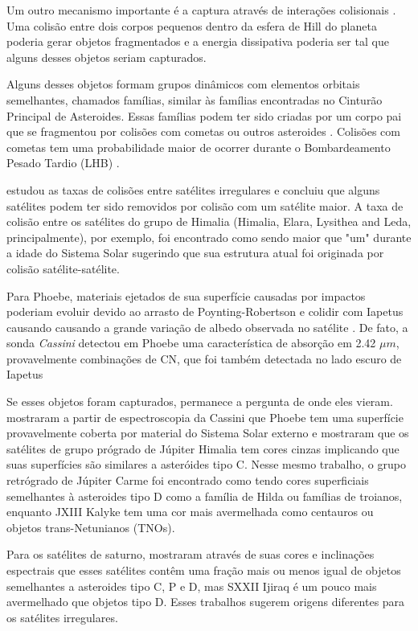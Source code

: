 \documentclass[12pt,a4paper]{monografia}
\begin{document}
Um outro mecanismo importante é a captura através de interações colisionais \citep{Sheppard2005}. Uma colisão entre dois corpos pequenos dentro da esfera de Hill do planeta poderia gerar objetos fragmentados e a energia dissipativa poderia ser tal que alguns desses objetos seriam capturados.

Alguns desses objetos formam grupos dinâmicos com elementos orbitais semelhantes, chamados famílias, similar às famílias encontradas no Cinturão Principal de Asteroides. Essas famílias podem ter sido criadas por um corpo pai que se fragmentou por colisões com cometas ou outros asteroides \citep{Nesvorny2004}. Colisões com cometas tem uma probabilidade maior de ocorrer durante o Bombardeamento Pesado Tardio (LHB) \citep{Gomes2005}.

\cite{Nesvorny2003} estudou as taxas de colisões entre satélites irregulares e concluiu que alguns satélites podem ter sido removidos por colisão com um satélite maior. A taxa de colisão entre os satélites do grupo de Himalia (Himalia, Elara, Lysithea and Leda, principalmente), por exemplo, foi encontrado como sendo maior que "um" durante a idade do Sistema Solar sugerindo que sua estrutura atual foi originada por colisão satélite-satélite.

Para Phoebe, materiais ejetados de sua superfície causadas por impactos poderiam evoluir devido ao arrasto de Poynting-Robertson e colidir com Iapetus causando causando a grande variação de albedo observada no satélite \citep{Nesvorny2003}. De fato, a sonda \textit{Cassini} detectou em Phoebe uma característica de absorção em 2.42 $\mu m$, provavelmente combinações de CN, que foi também detectada no lado escuro de Iapetus \citep{Clark2005}

Se esses objetos foram capturados, permanece a pergunta de onde eles vieram. \citealp{Clark2005} mostraram a partir de espectroscopia da Cassini que Phoebe tem uma superfície provavelmente coberta por material do Sistema Solar externo e \citealp{Grav2003} mostraram que os satélites de grupo prógrado de Júpiter Himalia tem cores cinzas implicando que suas superfícies são similares a asteróides tipo C. Nesse mesmo trabalho, o grupo retrógrado de Júpiter Carme foi encontrado como tendo cores superficiais semelhantes à asteroides tipo D como a família de Hilda ou famílias de troianos, enquanto JXIII Kalyke tem uma cor mais avermelhada como centauros ou objetos trans-Netunianos (TNOs).

Para os satélites de saturno, \citealp{Grav2007} mostraram através de suas cores e inclinações espectrais que esses satélites contêm uma fração mais ou menos igual de objetos semelhantes a asteroides tipo C, P e D, mas SXXII Ijiraq é um pouco mais avermelhado que objetos tipo D. Esses trabalhos sugerem origens diferentes para os satélites irregulares.
\end{document}
